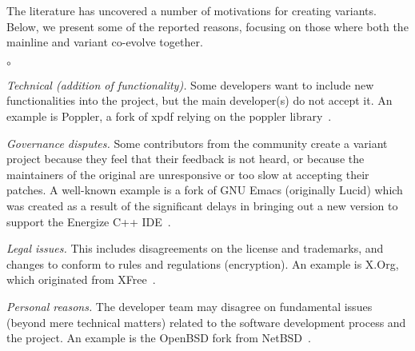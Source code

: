 The literature has uncovered a number of motivations for creating variants. Below, we present some of the reported reasons, focusing on those where both the mainline and variant co-evolve together.


\begin{list}{$\circ$}{}
   \item \textit{Technical (addition of functionality).} Some developers want to include new functionalities into the project, but the main developer(s) do not accept it. An example is \textsf{Poppler}, a fork of \textsf{xpdf} relying on the \textsf{poppler} library~\cite{Gregorio:2012}.

    \item \textit{Governance disputes.} Some contributors from the community create a variant project because they feel that their feedback is not heard, or because the maintainers of the original are unresponsive or too slow at accepting their patches. A well-known example is a fork of \textsf{GNU Emacs} (originally \textsf{Lucid}) which was created as a result of the significant delays in bringing out a new version to support the Energize C++ IDE~\cite{Wheeler:2015Forking}.

\item \textit{Legal issues.} This includes disagreements on the license and trademarks, and changes to conform to rules and regulations (encryption). An example is \textsf{X.Org}, which originated from \textsf{XFree}~\cite{Gregorio:2012,Wheeler:2015Forking}.

\item \textit{Personal reasons.} The developer team may disagree on fundamental issues (beyond mere technical matters) related to the software development process and the project. An example is the \textsf{OpenBSD} fork from \textsf{NetBSD}~\cite{Gregorio:2012}.


\end{list}


